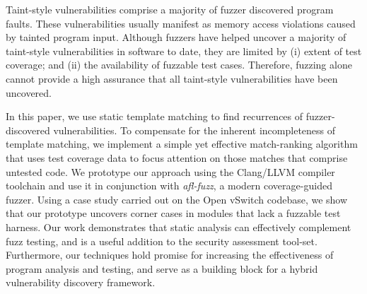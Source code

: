 Taint-style vulnerabilities comprise a majority of fuzzer discovered program faults.
These vulnerabilities usually manifest as memory access violations caused by tainted program input.
Although fuzzers have helped uncover a majority of taint-style vulnerabilities in software to date, they are limited by (i) extent of test coverage; and (ii) the availability of fuzzable test cases.
Therefore, fuzzing alone cannot provide a high assurance that all taint-style vulnerabilities have been uncovered.

In this paper, we use static template matching to find recurrences of fuzzer-discovered vulnerabilities.
To compensate for the inherent incompleteness of template matching, we implement a simple yet effective match-ranking algorithm that uses test coverage data to focus attention on those matches that comprise untested code.
We prototype our approach using the Clang/LLVM compiler toolchain and use it in conjunction with {\it afl-fuzz}, a modern coverage-guided fuzzer.
Using a case study carried out on the Open vSwitch codebase, we show that our prototype uncovers corner cases in modules that lack a fuzzable test harness.
Our work demonstrates that static analysis can effectively complement fuzz testing, and is a useful addition to the security assessment tool-set.
Furthermore, our techniques hold promise for increasing the effectiveness of program analysis and testing, and serve as a building block for a hybrid vulnerability discovery framework.